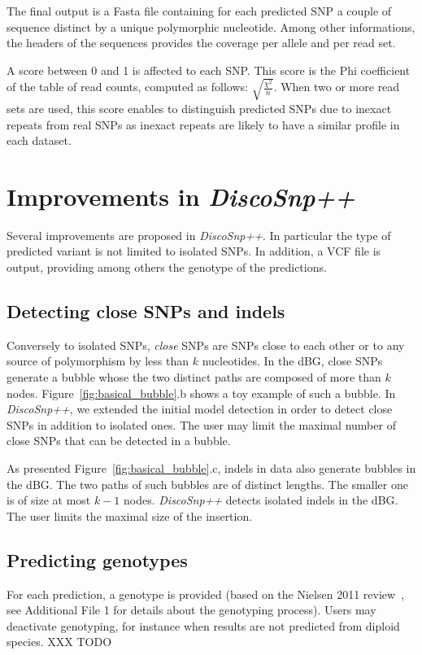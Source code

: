 \documentclass{bmcart}
\newcommand{\discopp}{{\it DiscoSnp++}\xspace}
\begin{document}
The final output is a Fasta file containing for each predicted SNP a couple of sequence distinct by a unique polymorphic nucleotide. Among other informations, the headers of the sequences provides the coverage per allele and per read set. 

A score between 0 and 1 is affected to each SNP. This score is the Phi coefficient of the table of read counts, computed as follows: $\sqrt{\frac{\chi^2}{n}}$. When two or more read sets are used, this score enables to distinguish predicted SNPs due to inexact repeats from real SNPs as inexact repeats are likely to have a similar profile in each dataset.  



\section*{Improvements in \discopp}
Several improvements are proposed in \discopp. In particular the type of predicted variant is not limited to isolated SNPs. In addition, a VCF file is output, providing among others the genotype of the predictions.

\subsection*{Detecting close SNPs and indels}


Conversely to isolated SNPs, \emph{close} SNPs are SNPs close to each other or to any source of polymorphism by less than $k$ nucleotides.
In the dBG, close SNPs generate a bubble whose the two distinct paths are composed of more than $k$ nodes. Figure~\ref{fig:basical_bubble}.b shows a toy example of such a bubble.  
In \discopp, we extended the initial model detection in order to detect close SNPs in addition to isolated ones. The user may limit the maximal number of close SNPs that can be detected in a bubble. %

As presented Figure~\ref{fig:basical_bubble}.c, indels in data also generate bubbles in the dBG. The two paths of such bubbles are of distinct lengths. The smaller one is of size at most $k-1$ nodes. \discopp detects isolated indels in the dBG. The user limits the maximal size of the insertion. 

\subsection*{Predicting genotypes}
For each prediction, a genotype is provided (based on the Nielsen 2011 review~\cite{Nielsen2011}, see Additional File 1 for details about the genotyping process). Users may deactivate genotyping, for instance when results are not predicted from diploid species. XXX TODO
\end{document}
